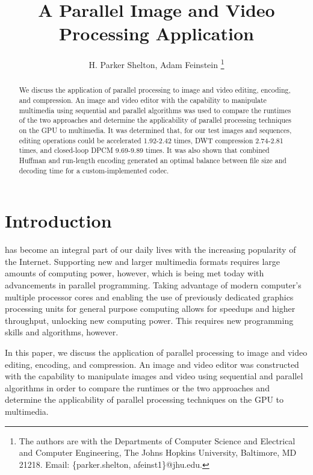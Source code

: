 \documentclass[10pt,twocolumn,twoside]{IEEEtran}
\begin{document}
\title{A Parallel Image and Video Processing Application}
\author{H. Parker Shelton, Adam Feinstein
\thanks{The authors are with the Departments of Computer Science and Electrical and Computer Engineering, The 
Johns Hopkins University, Baltimore, MD 21218.
Email: \{parker.shelton, afeinst1\}@jhu.edu.}}

\maketitle
\vskip -20pt

\begin{abstract}
We discuss the application of parallel processing to image and video editing, encoding, and compression. An 
image and video editor with the capability to manipulate multimedia using sequential and parallel algorithms 
was used to compare the runtimes of the two approaches and determine the applicability of parallel processing 
techniques on the GPU to multimedia. It was determined that, for our test images and sequences, editing 
operations could be accelerated 1.92-2.42 times, DWT compression 2.74-2.81 times, and closed-loop DPCM 
9.69-9.89 times. It was also shown that combined Huffman and run-length encoding generated an optimal balance 
between file size and decoding time for a custom-implemented codec.
\end{abstract}

\section{Introduction}
 has become an integral part of our daily lives with the increasing popularity of the 
Internet. Supporting new and larger multimedia formats requires large amounts of computing power, however, 
which is being met today with advancements in parallel programming. Taking advantage of modern computer's 
multiple processor cores and enabling the use of previously dedicated graphics processing units for general 
purpose computing allows for speedups and higher throughput, unlocking new computing power. This requires new 
programming skills and algorithms, however.

In this paper, we discuss the application of parallel processing to image and video editing, encoding, and 
compression. An image and video editor was constructed with the capability to manipulate images and video 
using sequential and parallel algorithms in order to compare the runtimes or the two approaches and determine 
the applicability of parallel processing techniques on the GPU to multimedia.
\end{document}
